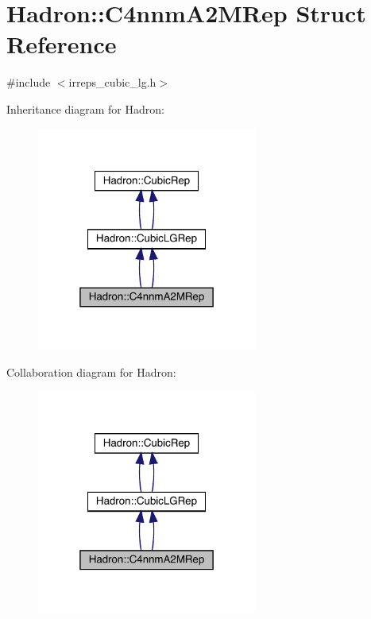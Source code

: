 \hypertarget{structHadron_1_1C4nnmA2MRep}{}\section{Hadron\+:\+:C4nnm\+A2\+M\+Rep Struct Reference}
\label{structHadron_1_1C4nnmA2MRep}


{\ttfamily \#include $<$irreps\+\_\+cubic\+\_\+lg.\+h$>$}



Inheritance diagram for Hadron\+:\nopagebreak
\begin{figure}[H]
\begin{center}
\leavevmode
\includegraphics[width=205pt]{da/d54/structHadron_1_1C4nnmA2MRep__inherit__graph}
\end{center}
\end{figure}


Collaboration diagram for Hadron\+:\nopagebreak
\begin{figure}[H]
\begin{center}
\leavevmode
\includegraphics[width=205pt]{d6/d31/structHadron_1_1C4nnmA2MRep__coll__graph}
\end{center}
\end{figure}
